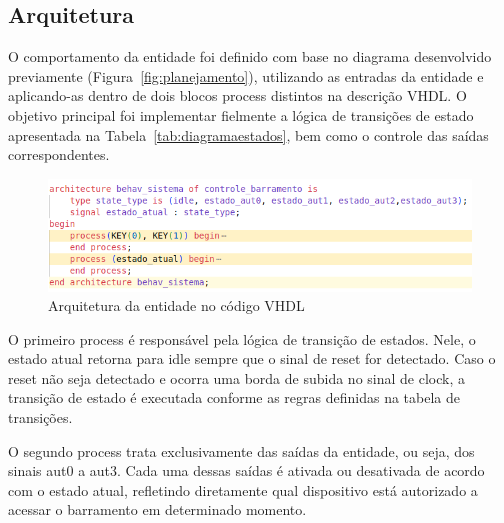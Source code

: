 \documentclass[oneside]{uffstex}
\begin{document}
\subsection{Arquitetura}
O comportamento da entidade foi definido com base no diagrama desenvolvido previamente (Figura~\ref{fig:planejamento}), utilizando as entradas da entidade e aplicando-as dentro de dois blocos process distintos na descrição VHDL. O objetivo principal foi implementar fielmente a lógica de transições de estado apresentada na Tabela~\ref{tab:diagramaestados}, bem como o controle das saídas correspondentes. 
\begin{figure}[H]
    \centering
    \includegraphics[width=0.9\linewidth]{ARCHITECTURE.png}
    \caption{Arquitetura da entidade no código VHDL}
    \label{fig:arquitetura}
\end{figure}
O primeiro process é responsável pela lógica de transição de estados. Nele, o estado atual retorna para idle sempre que o sinal de reset for detectado. Caso o reset não seja detectado e ocorra uma borda de subida no sinal de clock, a transição de estado é executada conforme as regras definidas na tabela de transições.

O segundo process trata exclusivamente das saídas da entidade, ou seja, dos sinais aut0 a aut3. Cada uma dessas saídas é ativada ou desativada de acordo com o estado atual, refletindo diretamente qual dispositivo está autorizado a acessar o barramento em determinado momento.
\end{document}
